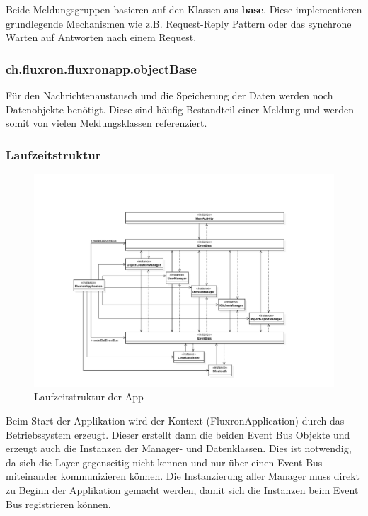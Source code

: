 Beide Meldungsgruppen basieren auf den Klassen aus \textbf{base}. Diese implementieren grundlegende Mechanismen wie z.B. Request-Reply Pattern oder das synchrone Warten auf Antworten nach einem Request.

\subsubsection{ch.fluxron.fluxronapp.objectBase}
Für den Nachrichtenaustausch und die Speicherung der Daten werden noch Datenobjekte benötigt. Diese sind häufig Bestandteil einer Meldung und werden somit von vielen Meldungsklassen referenziert.

\subsubsection{Laufzeitstruktur}
\begin{figure}[H]
    \begin{center}
        \includegraphics[trim=100 30 0 90,clip,scale=0.7]{results/res/instances}
    \end{center}
    \caption{Laufzeitstruktur der App}
    \label{abb:instances}
\end{figure}

Beim Start der Applikation wird der Kontext (FluxronApplication) durch das Betriebssystem  erzeugt. Dieser erstellt dann die beiden Event Bus Objekte und erzeugt auch die Instanzen der Manager- und Datenklassen. Dies ist notwendig, da sich die Layer gegenseitig nicht kennen und nur über einen Event Bus miteinander kommunizieren können. Die Instanzierung aller Manager muss direkt zu Beginn der Applikation gemacht werden, damit sich die Instanzen beim Event Bus registrieren können.

